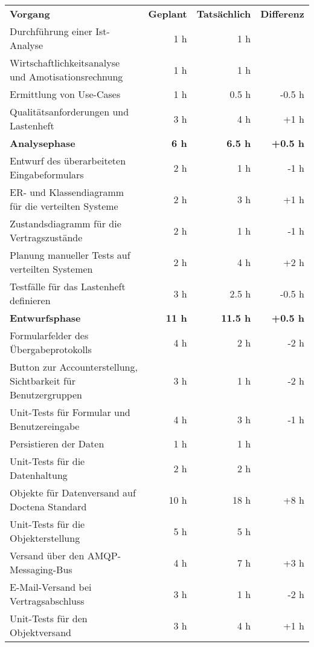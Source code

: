 \begin{tabularx}{\textwidth}{Xrrr}
\rowcolor{heading}\textbf{Vorgang} & \textbf{Geplant} & \textbf{Tatsächlich} & \textbf{Differenz} \\
Durchführung einer Ist-Analyse & 1 h   & 1 h   &  \\
\rowcolor{odd}Wirtschaftlichkeitsanalyse und Amotisationsrechnung & 1 h   & 1 h   &  \\
Ermittlung von Use-Cases & 1 h   & 0.5 h   & -0.5 h \\
\rowcolor{odd}Qualitätsanforderungen und Lastenheft & 3 h   & 4 h   & +1 h \\
\rowcolor{heading}\textbf{Analysephase} & \textbf{6 h} & \textbf{6.5 h} & \textbf{+0.5 h} \\
Entwurf des überarbeiteten Eingabeformulars & 2 h & 1 h & -1 h \\
\rowcolor{odd}ER- und Klassendiagramm für die verteilten Systeme & 2 h & 3 h & +1 h \\
Zustandsdiagramm für die Vertragszustände & 2 h & 1 h & -1 h \\
\rowcolor{odd}Planung manueller Tests auf verteilten Systemen & 2 h & 4 h & +2 h \\
Testfälle für das Lastenheft definieren & 3 h & 2.5 h & -0.5 h \\
\rowcolor{heading}\textbf{Entwurfsphase} & \textbf{11 h} & \textbf{11.5 h} & \textbf{+0.5 h} \\
Formularfelder des Übergabeprotokolls & 4 h & 2 h & -2 h \\
\rowcolor{odd}Button zur Accounterstellung, Sichtbarkeit für Benutzergruppen & 3 h & 1 h & -2 h \\
Unit-Tests für Formular und Benutzereingabe & 4 h & 3 h & -1 h \\
\rowcolor{odd}Persistieren der Daten & 1 h & 1 h &  \\
Unit-Tests für die Datenhaltung & 2 h & 2 h &  \\
\rowcolor{odd}Objekte für Datenversand auf Doctena Standard & 10 h & 18 h & +8 h \\
Unit-Tests für die Objekterstellung & 5 h & 5 h &  \\
\rowcolor{odd}Versand über den AMQP-Messaging-Bus & 4 h & 7 h & +3 h \\
E-Mail-Versand bei Vertragsabschluss & 3 h & 1 h & -2 h \\
\rowcolor{odd}Unit-Tests für den Objektversand & 3 h & 4 h & +1 h \\

\end{tabularx}
